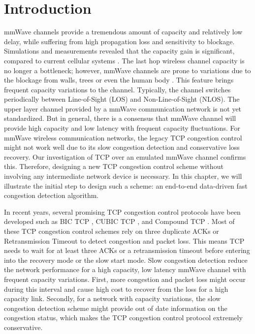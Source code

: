 \section{Introduction}
\par  mmWave channels provide a tremendous amount of capacity and relatively low delay, while suffering from high propagation loss and sensitivity to blockage. Simulations and measurements revealed that the capacity gain is significant, compared to current cellular systems \cite{akdeniz2014millimeter,bai2015coverage}. The last hop wireless channel capacity is no longer a bottleneck; however, mmWave channels are prone to variations due to the blockage from walls, trees or even the human body \cite{lu2012modeling, zhao201328, alejos2008measurement}. This feature brings frequent capacity variations to the channel. Typically, the channel switches periodically between Line-of-Sight (LOS) and Non-Line-of-Sight (NLOS). The upper layer channel provided by a mmWave communication network is not yet standardized. But in general, there is a consensus that mmWave channel will provide high capacity and low latency with frequent capacity fluctuations. For mmWave wireless communication networks, the legacy TCP congestion control might not work well due to its slow congestion detection and conservative loss recovery. Our investigation of TCP over an emulated mmWave channel confirms this. Therefore, designing a new TCP congestion control scheme without involving any intermediate network device is necessary. In this chapter, we will illustrate the initial step to design such a scheme: an end-to-end data-driven fast congestion detection algorithm.
\par In recent years, several promising TCP congestion control protocols have been developed such as BIC TCP \cite{xu2004binary}, CUBIC TCP \cite{ha2008cubic}, and Compound TCP \cite{tan2006compound}. Most of these TCP congestion control schemes rely on three duplicate ACKs or Retransmission Timeout to detect congestion and packet loss. This means TCP needs to wait for at least three ACKs or a retransmission timeout before entering into the recovery mode or the slow start mode. Slow congestion detection reduce the network performance for a high capacity, low latency mmWave channel with frequent capacity variations. First, more congestion and packet loss might occur during this interval and cause high cost to recover from the loss for a high capacity link. Secondly, for a network with capacity variations, the slow congestion detection scheme might provide out of date information on the congestion status, which makes the TCP congestion control protocol extremely conservative.
